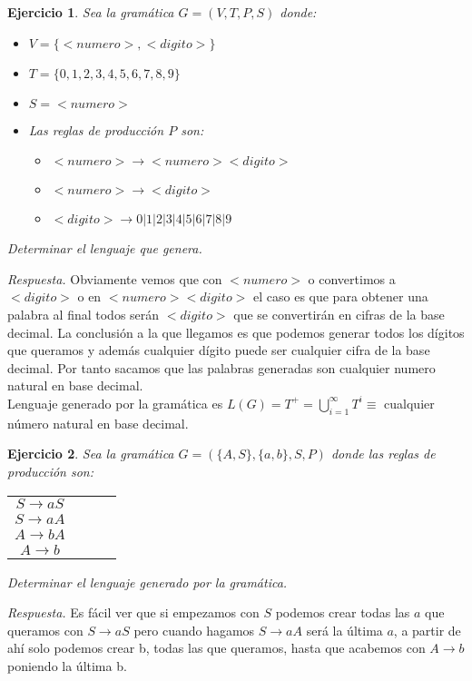\documentclass[11pt]{article}
\theoremstyle{ejercicio-style}
\newtheorem{ejer}{Ejercicio}
\begin{document}
\begin{ejer}
	Sea la gramática $G=(V,T,P,S)$ donde:
	\begin{itemize}
		\item $V = \{ <numero>,<digito>\}$
		\item $T = \{0,1,2,3,4,5,6,7,8,9\}$
		\item $S = <numero>$
		\item Las reglas de producción $P$ son:
		\begin{itemize}
			\item $<numero>\rightarrow <numero><digito> $
			\item $<numero>\rightarrow <digito> $
			\item $<digito>\rightarrow 0|1|2|3|4|5|6|7|8|9 $
		\end{itemize}
	\end{itemize}
	Determinar el lenguaje que genera.
\end{ejer}

\emph{Respuesta.} Obviamente vemos que con $<numero>$ o convertimos a $<digito>$ o en $<numero><digito>$ el caso es que para obtener una palabra al final todos serán $<digito>$ que se convertirán en cifras de la base decimal. La conclusión a la que llegamos es que podemos generar todos los dígitos que queramos y además cualquier dígito puede ser cualquier cifra de la base decimal. Por tanto sacamos que las palabras generadas son cualquier numero natural en base decimal. \\

Lenguaje generado por la gramática es $L(G) = T^+ = \bigcup\limits_{i=1}^{\infty} T^i \equiv$ cualquier número natural en base decimal. \\

\begin{ejer}
	Sea la gramática $G = (\{A,S\},\{a,b\},S,P)$ donde las reglas de producción son:
	\begin{center}
		\begin{tabular}{cccc}
			$ S \rightarrow aS $ \\
			$ S \rightarrow aA $ \\
			$ A \rightarrow bA $ \\
			$ A \rightarrow b $
		\end{tabular}
	\end{center}
	Determinar el lenguaje generado por la gramática.
\end{ejer}

\emph{Respuesta.} Es fácil ver que si empezamos con $S$ podemos crear todas las $a$ que queramos con $S \rightarrow aS$ pero cuando hagamos $S \rightarrow aA$ será la última $a$, a partir de ahí solo podemos crear b, todas las que queramos, hasta que acabemos con $A \rightarrow b$ poniendo la última b. \\
\end{document}
